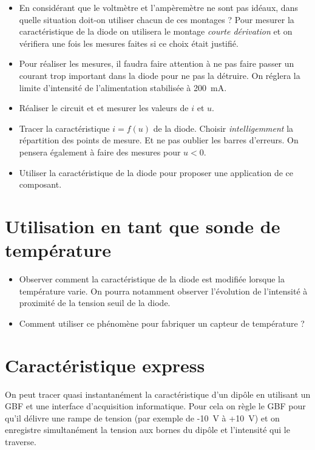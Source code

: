 \documentclass[]{tp}
\begin{document}
\begin{itemize}
	\item En considérant que le voltmètre et l'ampèremètre ne sont pas idéaux, dans quelle situation doit-on utiliser chacun de ces montages ? Pour mesurer la caractéristique de la diode on utilisera le montage \emph{courte dérivation} et on vérifiera une fois les mesures faites si ce choix était justifié. 

  \item Pour réaliser les mesures, il faudra faire attention à ne pas faire passer un courant trop important dans la diode pour ne pas la détruire. On réglera la limite d'intensité de l'alimentation stabilisée à \SI{200}{mA}. 

  \item Réaliser le circuit et et mesurer les valeurs de $i$ et $u$. 

	\item Tracer la caractéristique $i=f(u)$ de la diode. Choisir \emph{intelligemment} la répartition des points de mesure. Et ne pas oublier les barres d'erreurs. On pensera également à faire des mesures pour $u<0$. 

	\item Utiliser la caractéristique de la diode pour proposer une application de ce composant.
\end{itemize}

\section{Utilisation en tant que sonde de température}
\begin{itemize}

\item Observer comment la caractéristique de la diode est modifiée lorsque la température varie. On pourra notamment observer l'évolution de l'intensité à proximité de la tension seuil de la diode.

\item Comment utiliser ce phénomène pour fabriquer un capteur de température ?
\end{itemize}

\section{Caractéristique express}
On peut tracer quasi instantanément la caractéristique d'un dipôle en utilisant un GBF et une interface d'acquisition informatique. Pour cela on règle le GBF pour qu'il délivre une rampe de tension (par exemple de -10~V à +10~V) et on enregistre simultanément la tension aux bornes du dipôle et l'intensité qui le traverse.
\end{document}
